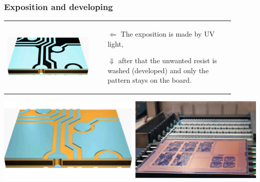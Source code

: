 \documentclass{beamer}
\begin{document}
	\begin{frame}
    \frametitle{Exposition and developing}

		\begin{center}
			\begin{tabular}{m{0.35\linewidth} m{0.55\linewidth}}
			 \includegraphics[scale=0.12]{obr06_jadroOsvit.png} &
				
				\begin{itemize}
					\item[$\Leftarrow$] The exposition is made by UV light,
					\item[$\Downarrow$] after that the unwanted resist is washed (developed) and only the pattern stays on the board.
				\end{itemize}
			\end{tabular}
			\includegraphics[scale=0.15]{obr07_jadroVyvolani.png}
		\end{center}
		
	\end{frame}
\end{document}
